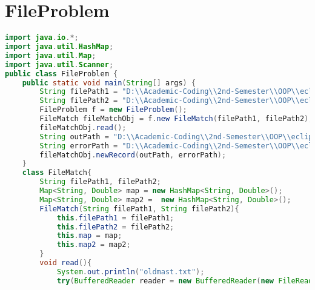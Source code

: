 \documentclass{article}
\begin{document}
\section*{FileProblem}
\begin{lstlisting}[language=Java, caption=Cosine Similarity Implementation]
import java.io.*;
import java.util.HashMap;
import java.util.Map;
import java.util.Scanner;
public class FileProblem {	
	public static void main(String[] args) {
		String filePath1 = "D:\\Academic-Coding\\2nd-Semester\\OOP\\eclipse-workplace\\LabExamPractice\\src\\oldmast.txt";
		String filePath2 = "D:\\Academic-Coding\\2nd-Semester\\OOP\\eclipse-workplace\\LabExamPractice\\src\\trans.txt";
		FileProblem f = new FileProblem();
		FileMatch fileMatchObj = f.new FileMatch(filePath1, filePath2);
		fileMatchObj.read();
		String outPath = "D:\\Academic-Coding\\2nd-Semester\\OOP\\eclipse-workplace\\LabExamPractice\\src\\newmast.txt";
		String errorPath = "D:\\Academic-Coding\\2nd-Semester\\OOP\\eclipse-workplace\\LabExamPractice\\src\\log.txt";;
		fileMatchObj.newRecord(outPath, errorPath);
	}
	class FileMatch{
		String filePath1, filePath2;
		Map<String, Double> map = new HashMap<String, Double>();
		Map<String, Double> map2 =  new HashMap<String, Double>();
		FileMatch(String filePath1, String filePath2){
			this.filePath1 = filePath1;
			this.filePath2 = filePath2;
			this.map = map;
			this.map2 = map2;
		}
		void read(){
			System.out.println("oldmast.txt");
			try(BufferedReader reader = new BufferedReader(new FileReader(filePath1))){

\end{lstlisting}
\end{document}
